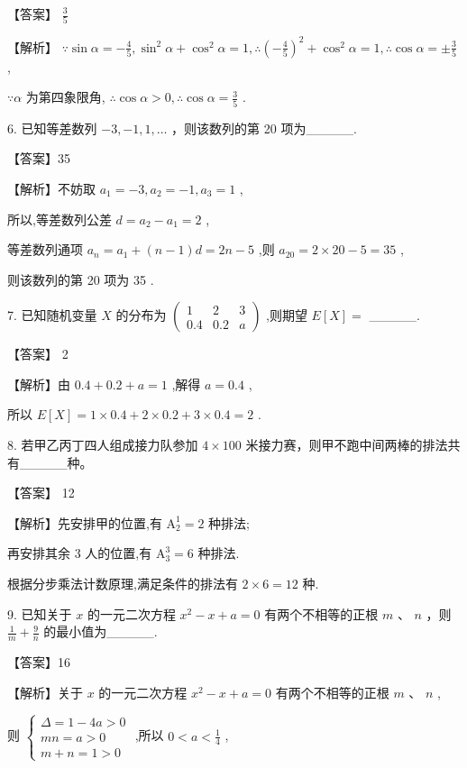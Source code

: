 \documentclass[10pt]{article}
\begin{document}
【答案】 \(\frac{3}{5}\)

【解析】 \(\because \sin \alpha  =  - \frac{4}{5},{\sin }^{2}\alpha  + {\cos }^{2}\alpha  = 1,\therefore {\left( -\frac{4}{5}\right) }^{2} + {\cos }^{2}\alpha  = 1,\therefore \cos \alpha  =  \pm  \frac{3}{5}\) ,

\(\because \alpha\) 为第四象限角, \(\therefore \cos \alpha  > 0,\therefore \cos \alpha  = \frac{3}{5}\) .

6. 已知等差数列 \(- 3, - 1,1,\ldots\) ，则该数列的第 20 项为\_\_\_\_\_.

【答案】35

【解析】不妨取 \({a}_{1} =  - 3,{a}_{2} =  - 1,{a}_{3} = 1\) ,

所以,等差数列公差 \(d = {a}_{2} - {a}_{1} = 2\) ,

等差数列通项 \({a}_{n} = {a}_{1} + \left( {n - 1}\right) d = {2n} - 5\) ,则 \({a}_{20} = 2 \times  {20} - 5 = {35}\) ,

则该数列的第 20 项为 35 .

7. 已知随机变量 \(X\) 的分布为 \(\left( \begin{matrix} 1 & 2 & 3 \\  {0.4} & {0.2} & a \end{matrix}\right)\) ,则期望 \(E\left\lbrack  X\right\rbrack   =\) \_\_\_\_\_.

【答案】 2

【解析】由 \({0.4} + {0.2} + a = 1\) ,解得 \(a = {0.4}\) ,

所以 \(E\left\lbrack  X\right\rbrack   = 1 \times  {0.4} + 2 \times  {0.2} + 3 \times  {0.4} = 2\) .

8. 若甲乙丙丁四人组成接力队参加 \(4 \times  {100}\) 米接力赛，则甲不跑中间两棒的排法共有\_\_\_\_\_种。

【答案】 12

【解析】先安排甲的位置,有 \({\mathrm{A}}_{2}^{1} = 2\) 种排法;

再安排其余 3 人的位置,有 \({\mathrm{A}}_{3}^{3} = 6\) 种排法.

根据分步乘法计数原理,满足条件的排法有 \(2 \times  6 = {12}\) 种.

9. 已知关于 \(x\) 的一元二次方程 \({x}^{2} - x + a = 0\) 有两个不相等的正根 \(m\text{ 、 }n\) ，则 \(\frac{1}{m} + \frac{9}{n}\) 的最小值为\_\_\_\_\_.

【答案】16

【解析】关于 \(x\) 的一元二次方程 \({x}^{2} - x + a = 0\) 有两个不相等的正根 \(m\text{ 、 }n\) ,

则 \(\left\{  \begin{array}{l} \Delta  = 1 - {4a} > 0 \\  {mn} = a > 0 \\  m + n = 1 > 0 \end{array}\right.\) ,所以 \(0 < a < \frac{1}{4}\) ,
\end{document}
